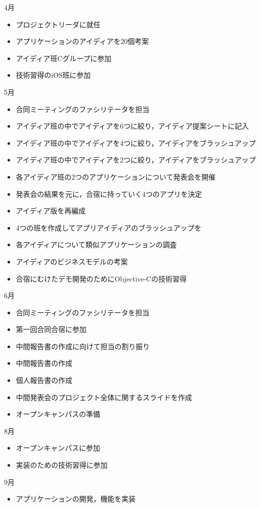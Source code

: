 4月
\begin{itemize}
\item プロジェクトリーダに就任
\item アプリケーションのアイディアを20個考案
\item アイディア班Cグループに参加
\item 技術習得のiOS班に参加
\end{itemize}
5月
\begin{itemize}
\item 合同ミーティングのファシリテータを担当
\item アイディア班の中でアイディアを6つに絞り，アイディア提案シートに記入
\item アイディア班の中でアイディアを4つに絞り，アイディアをブラッシュアップ
\item アイディア班の中でアイディアを2つに絞り，アイディアをブラッシュアップ
\item 各アイディア班の2つのアプリケーションについて発表会を開催
\item 発表会の結果を元に，合宿に持っていく4つのアプリを決定
\item アイディア版を再編成
\item 4つの班を作成してアプリアイディアのブラッシュアップを
\item 各アイディアについて類似アプリケーションの調査
\item アイディアのビジネスモデルの考案
\item 合宿にむけたデモ開発のためにObjective-Cの技術習得
\end{itemize}
6月
\begin{itemize}
\item 合同ミーティングのファシリテータを担当
\item 第一回合同合宿に参加
\item 中間報告書の作成に向けて担当の割り振り
\item 中間報告書の作成
\item 個人報告書の作成
\item 中間発表会のプロジェクト全体に関するスライドを作成
\item オープンキャンパスの準備
\end{itemize}
8月
\begin{itemize}
\item オープンキャンパスに参加
\item 実装のための技術習得に参加
\end{itemize}
\newpage
9月
\begin{itemize}
\item アプリケーションの開発，機能を実装
\end{itemize}
